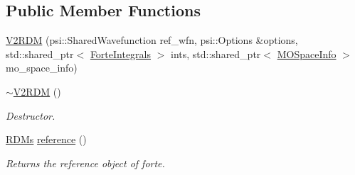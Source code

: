 \subsection*{Public Member Functions}
\begin{DoxyCompactItemize}
\item 
\mbox{\hyperlink{classforte_1_1_v2_r_d_m_a1817b9feceb439e982ff5f44d5aac6e6}{V2\+R\+DM}} (psi\+::\+Shared\+Wavefunction ref\+\_\+wfn, psi\+::\+Options \&options, std\+::shared\+\_\+ptr$<$ \mbox{\hyperlink{classforte_1_1_forte_integrals}{Forte\+Integrals}} $>$ ints, std\+::shared\+\_\+ptr$<$ \mbox{\hyperlink{classforte_1_1_m_o_space_info}{M\+O\+Space\+Info}} $>$ mo\+\_\+space\+\_\+info)
\item 
\mbox{\hyperlink{classforte_1_1_v2_r_d_m_a7e7771598e0c6a4fe6f975dd452efa79}{$\sim$\+V2\+R\+DM}} ()
\begin{DoxyCompactList}\small\item\em Destructor. \end{DoxyCompactList}\item 
\mbox{\hyperlink{classforte_1_1_r_d_ms}{R\+D\+Ms}} \mbox{\hyperlink{classforte_1_1_v2_r_d_m_afc67a5f2ac9d4d612fd11d0e1ebb036c}{reference}} ()
\begin{DoxyCompactList}\small\item\em Returns the reference object of forte. \end{DoxyCompactList}\end{DoxyCompactItemize}
